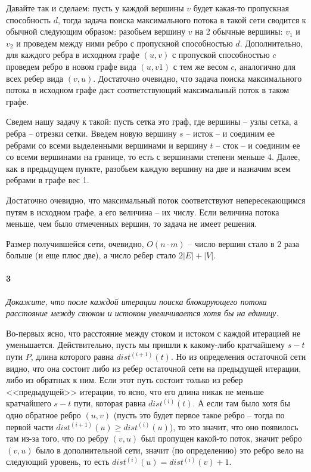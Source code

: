 \documentclass[russian]{article}
\begin{document}
Давайте так и сделаем: пусть у каждой вершины $v$ будет какая-то пропускная способность $d$, тогда задача поиска максимального потока в такой сети сводится к обычной следующим образом: разобьем вершину $v$ на 2 обычные вершины: $v_1$ и $v_2$ и проведем между ними ребро с пропускной способностью $d$. Дополнительно, для каждого ребра в исходном графе $(u, v)$ с пропуской способностью $c$ проведем ребро в новом графе вида $(u, v1)$ с тем же весом $c$, аналогично для всех ребер вида $(v, u)$. Достаточно очевидно, что задача поиска максимального потока в исходном графе даст соответствующий максимальный поток в таком графе.

Сведем нашу задачу к такой: пусть сетка это граф, где вершины -- узлы сетка, а ребра -- отрезки сетки. Введем новую вершину $s$ -- исток -- и соединим ее ребрами со всеми выделенными вершинами и вершину $t$ -- сток -- и соединим ее со всеми вершинами на границе, то есть с вершинами степени меньше 4. Далее, как в предыдущем пункте, разобьем каждую вершину на две и назначим всем ребрами в графе вес 1.

Достаточно очевидно, что максимальный поток соответствуют непересекающимся путям в исходном графе, а его величина -- их числу. Если величина потока меньше, чем было отмеченных вершин, то задача не имеет решения.

Размер получившейся сети, очевидно, $O(n \cdot m)$ -- число вершин стало в 2 раза больше (и еще плюс две), а число ребер стало $2|E| + |V|$.

\paragraph*{3}

\textit{Докажите, что после каждой итерации поиска блокирующего потока расстояние между стоком и истоком увеличивается хотя бы на единицу.}

Во-первых ясно, что расстояние между стоком и истоком с каждой итерацией не уменьшается. Действительно, пусть мы пришли к какому-либо кратчайшему $s-t$ пути $P$, длина которого равна $dist^{(i+1)}(t)$. Но из определения остаточной сети видно, что она состоит либо из ребер остаточной сети на предыдущей итерации, либо из обратных к ним. Если этот путь состоит только из ребер <<предыдущей>> итерации, то ясно, что его длина никак не меньше кратчайшего $s-t$ пути, которая равна $dist^{(i)}(t)$. А если там было хотя бы одно обратное ребро $(u, v)$ (пусть это будет первое такое ребро -- тогда по первой части $dist^{(i+1)}(u) \geqslant dist^{(i)}(u)$), то это значит, что оно появилось там из-за того, что по ребру $(v, u)$ был пропущен какой-то поток, значит ребро $(v, u)$ было в дополнительной сети, значит (по определению) это ребро вело на следующий уровень, то есть $dist^{(i)}(u) = dist^{(i)}(v) + 1$.
\end{document}
